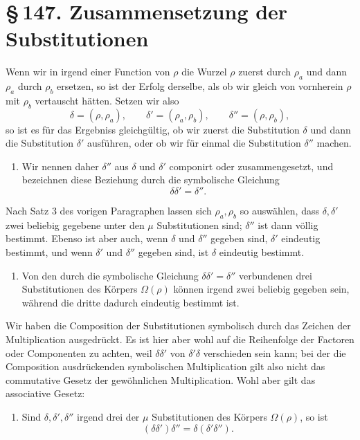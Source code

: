 \documentclass[11pt]{article}
\providecommand{\sect}[2]{\section*{\S\,#1. #2}}
\begin{document}
\sect{147}{Zusammensetzung der Substitutionen}

Wenn wir in irgend einer Function von $\rho$ die Wurzel $\rho$ zuerst durch $\rho_a$ und dann $\rho_a$ durch $\rho_b$ ersetzen, so ist der Erfolg derselbe, als ob wir gleich von vornherein $\rho$ mit $\rho_b$ vertauscht hätten. Setzen wir also
\[
\tag{1}
        \delta=(\rho,\rho_a),\qquad
        \delta'=(\rho_a,\rho_b),\qquad
        \delta''=(\rho,\rho_b),
\]
so ist es für das Ergebniss gleichgültig, ob wir zuerst die Substitution $\delta$ und dann die Substitution $\delta'$ ausführen, oder ob wir für einmal die Substitution $\delta''$ machen.

\begin{enumerate}[label=\arabic*.,leftmargin=2em]
\item Wir nennen daher $\delta''$ aus $\delta$ und $\delta'$ componirt oder zusammengesetzt, und bezeichnen diese Beziehung durch die symbolische Gleichung
\[
\tag{2}
        \delta\delta'=\delta''.
\]
\end{enumerate}

Nach Satz 3 des vorigen Paragraphen lassen sich $\rho_a,\rho_b$ so auswählen, dass $\delta,\delta'$ zwei beliebig gegebene unter den $\mu$ Substitutionen sind; $\delta''$ ist dann völlig bestimmt. Ebenso ist aber auch, wenn $\delta$ und $\delta''$ gegeben sind, $\delta'$ eindeutig bestimmt, und wenn $\delta'$ und $\delta''$ gegeben sind, ist $\delta$ eindeutig bestimmt.

\begin{enumerate}[label=\arabic*.,leftmargin=2em,start=2]
\item Von den durch die symbolische Gleichung $\delta\delta'=\delta''$ verbundenen drei Substitutionen des Körpers $\Omega(\rho)$ können irgend zwei beliebig gegeben sein, während die dritte dadurch eindeutig bestimmt ist.
\end{enumerate}

Wir haben die Composition der Substitutionen symbolisch durch das Zeichen der Multiplication ausgedrückt. Es ist hier aber wohl auf die Reihenfolge der Factoren oder Componenten zu achten, weil $\delta\delta'$ von $\delta'\delta$ verschieden sein kann; bei der die Composition ausdrückenden symbolischen Multiplication gilt also nicht das commutative Gesetz der gewöhnlichen Multiplication. Wohl aber gilt das associative Gesetz:

\begin{enumerate}[label=\arabic*.,leftmargin=2em,start=3]
\item Sind $\delta,\delta',\delta''$ irgend drei der $\mu$ Substitutionen des Körpers $\Omega(\rho)$, so ist
\[
\tag{3}
        (\delta\delta')\delta''=\delta(\delta'\delta'').
\]
\end{enumerate}
\end{document}
